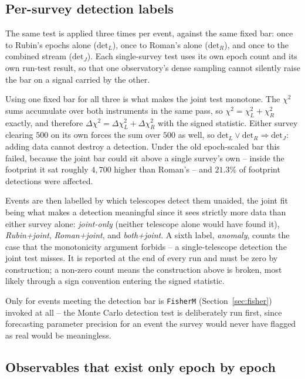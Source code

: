 \documentclass[english,10pt,a4paper]{article}
\begin{document}
	\subsection{Per-survey detection labels}
	\label{subsec:detclass}

	The same test is applied three times per event, against the same fixed bar: once to Rubin's epochs alone ($\mathrm{det}_L$), once to Roman's alone ($\mathrm{det}_R$), and once to the combined stream ($\mathrm{det}_J$). Each single-survey test uses its own epoch count and its own run-test result, so that one observatory's dense sampling cannot silently raise the bar on a signal carried by the other.

	Using one fixed bar for all three is what makes the joint test monotone. The $\chi^2$ sums accumulate over both instruments in the same pass, so $\chi^2 = \chi^2_L + \chi^2_R$ exactly, and therefore $\Delta\chi^2 = \Delta\chi^2_L + \Delta\chi^2_R$ with the signed statistic. Either survey clearing $500$ on its own forces the sum over $500$ as well, so $\mathrm{det}_L \lor \mathrm{det}_R \Rightarrow \mathrm{det}_J$: adding data cannot destroy a detection. Under the old epoch-scaled bar this failed, because the joint bar could sit above a single survey's own -- inside the footprint it sat roughly $4{,}700$ higher than Roman's -- and $21.3\%$ of footprint detections were affected.

	Events are then labelled by which telescopes detect them unaided, the joint fit being what makes a detection meaningful since it sees strictly more data than either survey alone: \emph{joint-only} (neither telescope alone would have found it), \emph{Rubin+joint}, \emph{Roman+joint}, and \emph{both+joint}. A sixth label, \emph{anomaly}, counts the case that the monotonicity argument forbids -- a single-telescope detection the joint test misses. It is reported at the end of every run and must be zero by construction; a non-zero count means the construction above is broken, most likely through a sign convention entering the signed statistic.

	Only for events meeting the detection bar is \texttt{FisherM} (Section~\ref{sec:fisher}) invoked at all -- the Monte Carlo detection test is deliberately run first, since forecasting parameter precision for an event the survey would never have flagged as real would be meaningless.
	
	\subsection{Observables that exist only epoch by epoch}
	\label{subsec:perepoch}
\end{document}
